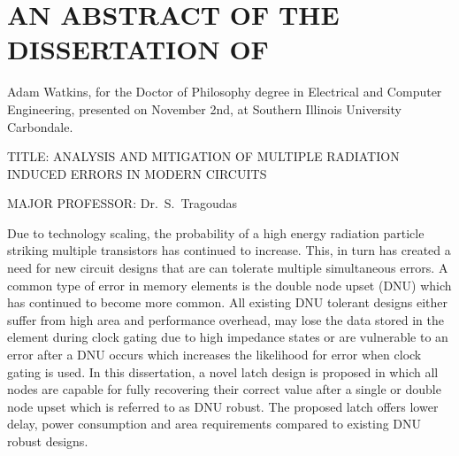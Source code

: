 


\chapter*{AN ABSTRACT OF THE DISSERTATION OF}

Adam Watkins, for the Doctor of Philosophy degree in Electrical and Computer Engineering,
presented on November 2nd, at Southern Illinois University Carbondale.

\vspace{14pt}
\noindent
TITLE: ANALYSIS AND MITIGATION OF MULTIPLE RADIATION INDUCED ERRORS IN MODERN CIRCUITS

\vspace{14pt}

\noindent
MAJOR PROFESSOR: Dr.\ S.\ Tragoudas

\vspace{14pt}

Due to technology scaling, the probability of a high energy radiation particle striking multiple transistors has continued to increase. This, in turn has created a need for new circuit designs that are can tolerate multiple simultaneous errors. A common type of error in memory elements is the double node upset (DNU) which has continued to become more common. All existing DNU tolerant designs either suffer from high area and performance overhead, may lose the data stored in the element during clock gating due to high impedance states or are vulnerable to an error after a DNU occurs which increases the likelihood for error when clock gating is used. In this dissertation, a novel latch design is proposed in which all nodes are capable for fully recovering their correct value after a single or double node upset which is referred to as DNU robust. The proposed latch offers lower delay, power consumption and area requirements compared to existing DNU robust designs.

